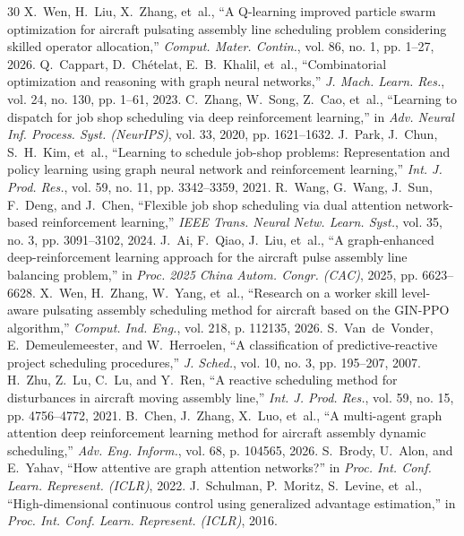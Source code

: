 \documentclass[journal,10pt]{IEEEtran}
\begin{document}
\begin{thebibliography}{30}
X.~Wen, H.~Liu, X.~Zhang, et~al., ``A Q-learning improved particle swarm optimization for aircraft pulsating assembly line scheduling problem considering skilled operator allocation,'' \textit{Comput. Mater. Contin.}, vol. 86, no. 1, pp. 1--27, 2026.
Q.~Cappart, D.~Ch\'etelat, E.~B.~Khalil, et~al., ``Combinatorial optimization and reasoning with graph neural networks,'' \textit{J. Mach. Learn. Res.}, vol. 24, no. 130, pp. 1--61, 2023.
C.~Zhang, W.~Song, Z.~Cao, et~al., ``Learning to dispatch for job shop scheduling via deep reinforcement learning,'' in \textit{Adv. Neural Inf. Process. Syst. (NeurIPS)}, vol. 33, 2020, pp. 1621--1632.
J.~Park, J.~Chun, S.~H.~Kim, et~al., ``Learning to schedule job-shop problems: Representation and policy learning using graph neural network and reinforcement learning,'' \textit{Int. J. Prod. Res.}, vol. 59, no. 11, pp. 3342--3359, 2021.
R.~Wang, G.~Wang, J.~Sun, F.~Deng, and J.~Chen, ``Flexible job shop scheduling via dual attention network-based reinforcement learning,'' \textit{IEEE Trans. Neural Netw. Learn. Syst.}, vol. 35, no. 3, pp. 3091--3102, 2024.
J.~Ai, F.~Qiao, J.~Liu, et~al., ``A graph-enhanced deep-reinforcement learning approach for the aircraft pulse assembly line balancing problem,'' in \textit{Proc. 2025 China Autom. Congr. (CAC)}, 2025, pp. 6623--6628.
X.~Wen, H.~Zhang, W.~Yang, et~al., ``Research on a worker skill level-aware pulsating assembly scheduling method for aircraft based on the GIN-PPO algorithm,'' \textit{Comput. Ind. Eng.}, vol. 218, p. 112135, 2026.
S.~Van~de~Vonder, E.~Demeulemeester, and W.~Herroelen, ``A classification of predictive-reactive project scheduling procedures,'' \textit{J. Sched.}, vol. 10, no. 3, pp. 195--207, 2007.
H.~Zhu, Z.~Lu, C.~Lu, and Y.~Ren, ``A reactive scheduling method for disturbances in aircraft moving assembly line,'' \textit{Int. J. Prod. Res.}, vol. 59, no. 15, pp. 4756--4772, 2021.
B.~Chen, J.~Zhang, X.~Luo, et~al., ``A multi-agent graph attention deep reinforcement learning method for aircraft assembly dynamic scheduling,'' \textit{Adv. Eng. Inform.}, vol. 68, p. 104565, 2026.
S.~Brody, U.~Alon, and E.~Yahav, ``How attentive are graph attention networks?'' in \textit{Proc. Int. Conf. Learn. Represent. (ICLR)}, 2022.
J.~Schulman, P.~Moritz, S.~Levine, et~al., ``High-dimensional continuous control using generalized advantage estimation,'' in \textit{Proc. Int. Conf. Learn. Represent. (ICLR)}, 2016.

\end{thebibliography}
\end{document}
